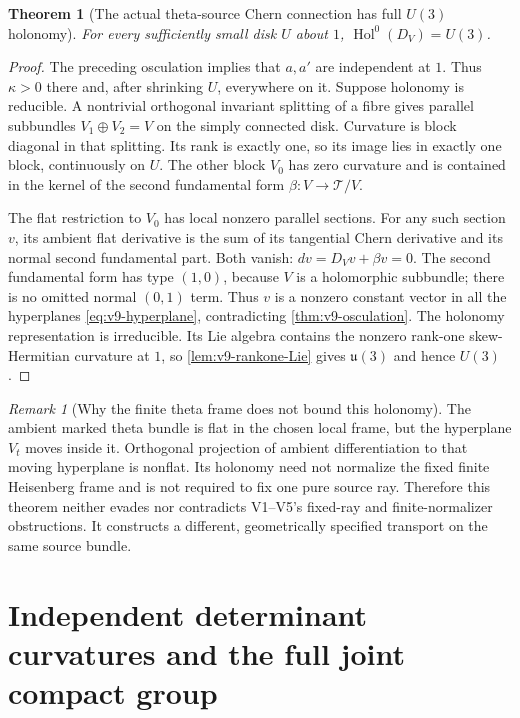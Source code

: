\documentclass[11pt]{article}
\newtheorem{theorem}{Theorem}[section]
\theoremstyle{definition}
\theoremstyle{remark}
\newtheorem{remark}[remark]{Remark}
\begin{document}
\begin{theorem}[The actual theta-source Chern connection has full $U(3)$ holonomy]
\label{thm:v9-U3}
For every sufficiently small disk $U$ about $1$,
$\operatorname{Hol}^0(D_V)=U(3)$.
\end{theorem}
\begin{proof}
The preceding osculation implies that $a,a'$ are independent at $1$.
Thus $\kappa>0$ there and, after shrinking $U$, everywhere on it.
Suppose holonomy is reducible. A nontrivial orthogonal invariant splitting
of a fibre gives parallel subbundles $V_1\oplus V_2=V$ on the simply
connected disk. Curvature is block diagonal in that splitting. Its rank
is exactly one, so its image lies in exactly one block, continuously on
$U$. The other block $V_0$ has zero curvature and is contained in the
kernel of the second fundamental form $\beta:V\to\mathcal T/V$.

The flat restriction to $V_0$ has local nonzero parallel sections. For any
such section $v$, its ambient flat derivative is the sum of its tangential
Chern derivative and its normal second fundamental part. Both vanish:
$dv=D_Vv+\beta v=0$. The second fundamental form has type $(1,0)$,
because $V$ is a holomorphic subbundle; there is no omitted normal
$(0,1)$ term. Thus $v$ is a nonzero constant vector in all the hyperplanes
\cref{eq:v9-hyperplane}, contradicting \cref{thm:v9-osculation}.
The holonomy representation is irreducible. Its Lie algebra contains the
nonzero rank-one skew-Hermitian curvature at $1$, so
\cref{lem:v9-rankone-Lie} gives $\mathfrak u(3)$ and hence $U(3)$.
\end{proof}

\begin{remark}[Why the finite theta frame does not bound this holonomy]
The ambient marked theta bundle is flat in the chosen local frame, but the
hyperplane $V_t$ moves inside it. Orthogonal projection of ambient
differentiation to that moving hyperplane is nonflat. Its holonomy need not
normalize the fixed finite Heisenberg frame and is not required to fix one
pure source ray. Therefore this theorem neither evades nor contradicts
V1--V5's fixed-ray and finite-normalizer obstructions. It constructs a
different, geometrically specified transport on the same source bundle.
\end{remark}

\section{Independent determinant curvatures and the full joint compact group}
\label{sec:v9-joint}
\end{document}
